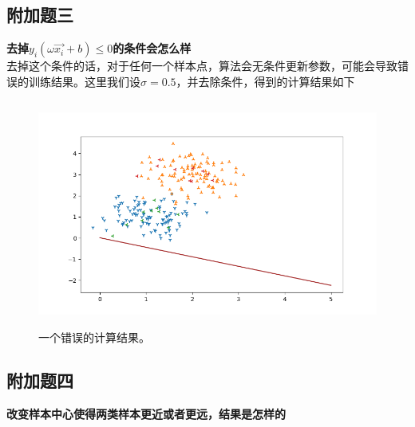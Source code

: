 \documentclass{article}
\begin{document}
 \subsection*{\Large 附加题三}
 {\large\textbf{去掉$y_i(\omega \overrightarrow{x_i} +b)\leq 0$的条件会怎么样}}\\


 去掉这个条件的话，对于任何一个样本点，算法会无条件更新参数，可能会导致错误的训练结果。这里我们设$\sigma=0.5$，并去除条件，得到的计算结果如下
 \begin{figure}[H]
    \centering
    \begin{minipage}[t]{1.0\linewidth}
        \centering
        \includegraphics[height=7.5cm]{Figure_6.png}
        \caption{一个错误的计算结果。}
    \end{minipage}
 \end{figure}


 \subsection*{\Large 附加题四}
 {\large\textbf{改变样本中心使得两类样本更近或者更远，结果是怎样的}}\\
\end{document}

